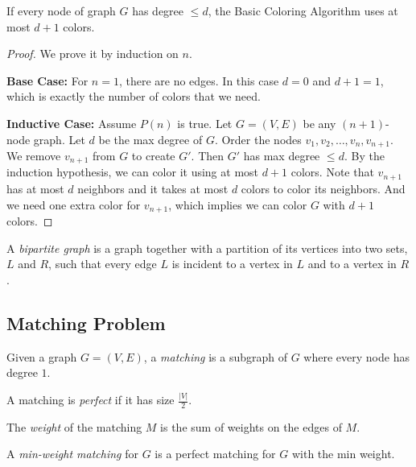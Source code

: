 \documentclass[11pt]{article}
\begin{document}
\begin{theorem}
If every node of graph $G$ has degree $\leq d$, the Basic Coloring Algorithm uses at most $d+1$
colors.
\end{theorem}

\begin{proof}
We prove it by induction on $n$.

\textbf{Base Case:} For $n=1$, there are no edges. In this case $d = 0$ and $d+1=1$, which is
exactly the number of colors that we need.

\textbf{Inductive Case:} Assume $P(n)$ is true. Let $G=(V,E)$ be any $(n+1)$-node graph. Let $d$ be
the max degree of $G$. Order the nodes $v_1,v_2,\dots,v_n,v_{n+1}$. We remove $v_{n+1}$ from $G$ to
create $G'$. Then $G'$ has max degree $\leq d$. By the induction hypothesis, we can color it using
at most $d+1$ colors. Note that $v_{n+1}$ has at most $d$ neighbors and it takes at most $d$ colors
to color its neighbors. And we need one extra color for $v_{n+1}$, which implies we can color $G$
with $d+1$ colors.
\end{proof}

\begin{definition}
A \emph{bipartite graph} is a graph together with a partition of its vertices into two sets, $L$ and
$R$, such that every edge $L$ is incident to a vertex in $L$ and to a vertex in $R$.
\end{definition}

\subsection{Matching Problem}

\begin{definition}
Given a graph $G = (V, E)$, a \emph{matching} is a subgraph of $G$ where every node has degree $1$.
\end{definition}

\begin{definition}
A matching is \emph{perfect} if it has size $\frac{|V|}{2}$.
\end{definition}

\begin{definition}
The \emph{weight} of the matching $M$ is the sum of weights on the edges of $M$.
\end{definition}

\begin{definition}
A \emph{min-weight matching} for $G$ is a perfect matching for $G$ with the min weight.
\end{definition}
\end{document}

